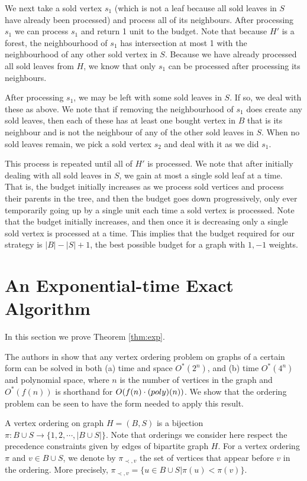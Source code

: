 \documentclass[letterpaper,11pt,abstracton]{scrartcl}
\begin{document}
We next take a sold vertex $s_1$ (which is not a leaf because all sold
leaves in $S$ have already been processed) and process all of its neighbours.  After processing
$s_1$ we can process $s_1$ and return 1 unit to the budget.  Note that because
$H'$ is a forest, the neighbourhood of $s_1$ has intersection at most 1 with the
neighbourhood of any other sold vertex in $S$.  Because we have already processed all
sold leaves from $H$, we know that only $s_1$ can be processed after processing
its neighbours.

After processing $s_1$, we may be left with some sold leaves in $S$.  If so,
we deal with these as above.  We note that if removing the neighbourhood of
$s_1$ does create any sold leaves, then each of these has at least one
bought vertex in $B$ that is its neighbour and is not the neighbour of any of the other
sold leaves in $S$.  When no sold leaves remain, we pick a
sold vertex $s_2$ and deal with it as we did $s_1$.

This process is repeated until all of $H'$ is processed.  We note that after initially
dealing with all sold leaves in $S$, we gain at most a single sold leaf at a time.
That is, the budget initially increases as we process sold vertices and process their
parents in the tree, and then the budget goes down progressively, only ever
temporarily going up by a single unit each time a sold vertex is processed.
Note that the budget initially increases, and then once it is decreasing
only a single sold vertex is processed at a time.  This implies that the budget required
for our strategy is $|B|-|S|+1$, the best possible budget for a graph with
$1, -1$ weights.






\section{An Exponential-time Exact Algorithm}\label{sec:exp}
In this section we prove Theorem \ref{thm:exp}.

The authors in \cite{BFKKT} show that any vertex ordering problem on
graphs of a certain form can be solved in both (a) time and space
$O^*(2^n)$, and (b) time $O^*(4^n)$ and polynomial space, where $n$ is
the number of vertices in the graph and $O^*(f(n))$ is shorthand for
$O(f(n)\cdot \textnormal(poly)(n))$.  We show that the ordering
problem can be seen to have the form needed to apply this result.

A vertex ordering on graph $H=(B,S)$ is a bijection $\pi: B\cup
S\rightarrow \lbrace1,2,\cdots, |B\cup S|\rbrace$.
Note that orderings we consider here respect the precedence
constraints given by edges of bipartite graph $H$.
For a vertex
ordering $\pi$ and $v\in B\cup S$, we denote by $\pi_{\prec,v}$ the
set of vertices that appear before $v$ in the ordering.  More
precisely, $\pi_{\prec,v}=\lbrace u\in B\cup S| \pi(u) <
\pi(v)\rbrace$.
\end{document}
